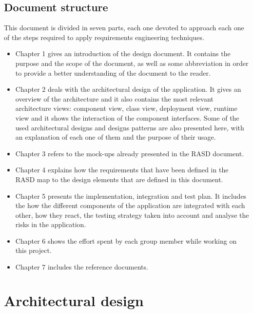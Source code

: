 \documentclass[a4paper, hidelinks, 12pt]{report}
\begin{document}
	\section{Document structure}
	This document is divided in seven parts, each one devoted to approach each one of the steps required to apply requirements engineering techniques.
	\begin{itemize}
		\item Chapter 1 gives an introduction of the design document. It contains the purpose and the scope of the document, as well as some abbreviation in order to provide a better understanding of the document to the reader.
		\item Chapter 2  deals with the architectural design of the application. It gives an overview of the architecture
and it also contains the most relevant architecture views: component view, class view, deployment view, runtime view and it shows the interaction of the component interfaces. Some of the used architectural designs and designs patterns are also presented here, with an explanation of each one of them and the purpose of their usage.
		\item Chapter 3  refers to the mock-ups already presented in the RASD document.
		\item Chapter 4 explains how the requirements that have been defined in the RASD map to the design elements that are defined in this document.
		\item Chapter 5 presents the implementation, integration and test plan. It includes the how the different components of the application are integrated with each other, how they react, the testing strategy taken into account and analyse the risks in the application.
		\item Chapter 6 shows the effort spent by each group member while working on this project.
		\item Chapter 7 includes the reference documents.
	\end{itemize}
	
	\chapter{Architectural design}
	
\end{document}
